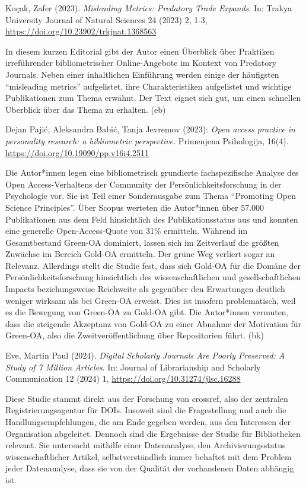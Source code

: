 \documentclass[a4paper,
fontsize=11pt,
oneside,
numbers=noperiodatend,
parskip=half-,
bibliography=totoc,
final
]{scrartcl}
\begin{document}
Koçak, Zafer (2023). \emph{Misleading Metrics: Predatory Trade Expands}.
In: Trakya University Journal of Natural Sciences 24 (2023) 2, 1-3,
\url{https://doi.org/10.23902/trkjnat.1368563}

In diesem kurzen Editorial gibt der Autor einen Überblick über Praktiken
irreführender bibliometrischer Online-Angebote im Kontext von Predatory
Journals. Neben einer inhaltlichen Einführung werden einige der
häufigsten \enquote{misleading metrics} aufgelistet, ihre
Charakteristiken aufgelistet und wichtige Publikationen zum Thema
erwähnt. Der Text eignet sich gut, um einen schnellen Überblick über das
Thema zu erhalten. (eb)

Dejan Pajić, Aleksandra Babić, Tanja Jevremov (2023): \emph{Open access
practice in personality research: a bibliometric perspective.}
Primenjena Psihologija, 16(4).
\url{https://doi.org/10.19090/pp.v16i4.2511}

Die Autor*innen legen eine bibliometrisch grundierte fachspezifische
Analyse des Open Access-Verhaltens der Community der
Persönlichkeitsforschung in der Psychologie vor. Sie ist Teil einer
Sonderausgabe zum Thema \enquote{Promoting Open Science Principles}.
Über Scopus werteten die Autor*innen über 57.000 Publikationen aus dem
Feld hinsichtlich des Publikationsstatus aus und konnten eine generelle
Open-Access-Quote von 31\% ermitteln. Während im Gesamtbestand Green-OA
dominiert, lassen sich im Zeitverlauf die größten Zuwächse im Bereich
Gold-OA ermitteln. Der grüne Weg verliert sogar an Relevanz. Allerdings
stellt die Studie fest, dass sich Gold-OA für die Domäne der
Persönlichkeitsforschung hinsichtlich des wissenschaftlichen und
gesellschaftlichen Impacts beziehungsweise Reichweite als gegenüber den
Erwartungen deutlich weniger wirksam als bei Green-OA erweist. Dies ist
insofern problematisch, weil es die Bewegung von Green-OA zu Gold-OA
gibt. Die Autor*innen vermuten, dass die steigende Akzeptanz von Gold-OA
zu einer Abnahme der Motivation für Green-OA, also die
Zweitveröffentlichung über Repositorien führt. (bk)

Eve, Martin Paul (2024). \emph{Digital Scholarly Journals Are Poorly
Preserved: A Study of 7 Million Articles}. In: Journal of Librarianship
and Scholarly Communication 12 (2024) 1,
\url{https://doi.org/10.31274/jlsc.16288}

Diese Studie stammt direkt aus der Forschung von crossref, also der
zentralen Registrierungsagentur für DOIs. Insoweit sind die
Fragestellung und auch die Handlungsempfehlungen, die am Ende gegeben
werden, aus den Interessen der Organisation abgeleitet. Dennoch sind die
Ergebnisse der Studie für Bibliotheken relevant. Sie untersucht mithilfe
einer Datenanalyse, den Archivierungsstatus wissenschaftlicher Artikel,
selbstverständlich immer behaftet mit dem Problem jeder Datenanalyse,
dass sie von der Qualität der vorhandenen Daten abhängig ist.
\end{document}
